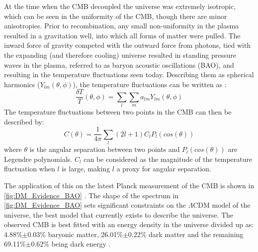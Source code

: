\par
At the time when the CMB decoupled the universe was extremely isotropic, which can be seen in the uniformity of the CMB, though there are minor anisotropies.
Prior to recombination, any small non-uniformity in the plasma resulted in a gravitation well, into which all forms of matter were pulled.
The inward force of gravity competed with the outward force from photons, tied with the expanding (and therefore cooling) universe resulted in standing pressure waves in the plasma, referred to as baryon acoustic oscillations (BAO), and resulting in the temperature fluctuations seen today.
Describing them as spherical harmonics ($Y_{lm}(\theta,\phi)$), the temperature fluctuations can be written as \cite{History_Of_Dark_Matter_2018_ref}:
\begin{equation}
    \frac{\delta T}{T}(\theta, \phi) = \sum_{l} \sum_{m} a_{lm}Y_{lm}(\theta,\phi)
    \label{eq:bao_spherical_harmonics}
\end{equation}
The temperature fluctuations between two points in the CMB can then be described by:
\begin{equation}
    C(\theta) = \frac{1}{4\pi} \sum_{l} (2l + 1) C_l P_l (cos(\theta))
\end{equation}
where $\theta$ is the angular separation between two points and $P_l (cos(\theta))$ are Legendre polynomials.
$C_l$ can be considered as the magnitude of the temperature fluctuation when $l$ is large, making $l$ a proxy for angular separation.
\par
The application of this on the latest Planck measurement of the CMB is shown in \autoref{fig:DM_Evidence_BAO} \cite{plank_result_ref}.
The shape of the spectrum in \autoref{fig:DM_Evidence_BAO} sets significant constraints on the $\Lambda$CDM model of the universe, the best model that currently exists to describe the universe.
The observed CMB is best fitted with an energy density in the universe divided up as: 4.88\%$\pm$0.03\% baryonic matter, 26.01\%$\pm$0.22\% dark matter and the remaining 69.11\%$\pm$0.62\% being dark energy \cite{plank_result_ref}.

